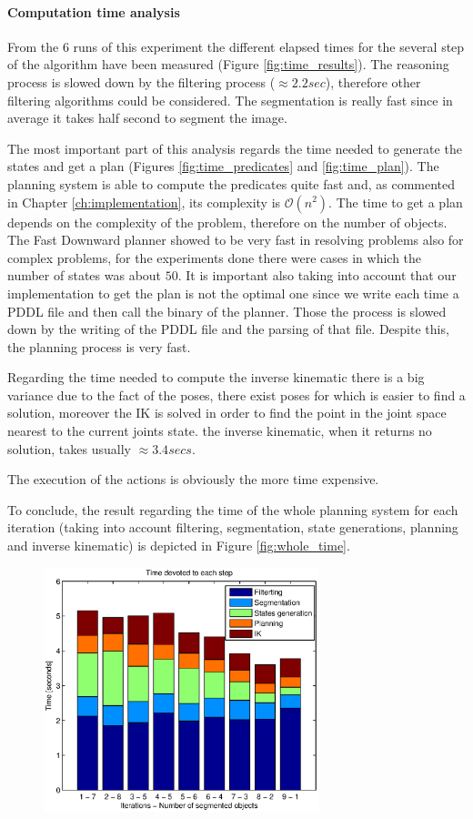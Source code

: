 \paragraph{Computation time analysis}
From the 6 runs of this experiment the different elapsed times for the several step of the algorithm have been measured (Figure \ref{fig:time_results}). The reasoning process is slowed down by the filtering process ($\approx 2.2sec$), therefore other filtering algorithms could be considered. The segmentation is really fast since in average it takes half second to segment the image. 

The most important part of this analysis regards the time needed to generate the states and get a plan (Figures \ref{fig:time_predicates} and \ref{fig:time_plan}). The planning system is able to compute the predicates quite fast and, as commented in Chapter \ref{ch:implementation}, its complexity is $\mathcal{O}(n^2)$. The time to get a plan depends on the complexity of the problem, therefore on the number of objects. The Fast Downward planner showed to be very fast in resolving problems also for complex problems, for the experiments done there were cases in which the number of states was about $50$. It is important also taking into account that our implementation to get the plan is not the optimal one since we write each time a PDDL file and then call the binary of the planner. Those the process is slowed down by the writing of the PDDL file and the parsing of that file. Despite this, the planning process is very fast. 

Regarding the time needed to compute the inverse kinematic there is a big variance due to the fact of the poses, there exist poses for which is easier to find a solution, moreover the IK is solved in order to find the point in the joint space nearest to the current joints state. the inverse kinematic, when it returns no solution, takes usually $\approx 3.4secs$. 

The execution of the actions is obviously the more time expensive.

To conclude, the result regarding the time of the whole planning system for each iteration (taking into account filtering, segmentation, state generations, planning and inverse kinematic) is depicted in Figure \ref{fig:whole_time}.


\begin{figure}
\centering
\includegraphics[width=8cm]{Img/experiments/exp_good/data/exp_times_no_actions.eps}
\end{figure}


